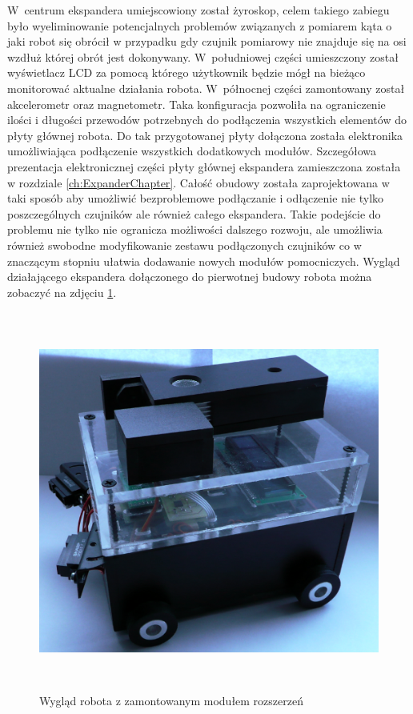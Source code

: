 W~centrum ekspandera umiejscowiony został żyroskop, celem takiego zabiegu było
wyeliminowanie potencjalnych problemów związanych z pomiarem kąta o jaki robot
się obrócił w przypadku gdy czujnik pomiarowy nie znajduje się na osi wzdłuż
której obrót jest dokonywany. W~południowej części umieszczony został
wyświetlacz LCD za pomocą którego użytkownik będzie mógł na bieżąco monitorować
aktualne działania robota. W~północnej części zamontowany został akcelerometr
oraz magnetometr. Taka konfiguracja pozwoliła na ograniczenie ilości i długości
przewodów potrzebnych do podłączenia wszystkich elementów do płyty głównej
robota. Do tak przygotowanej płyty dołączona została elektronika umożliwiająca
podłączenie wszystkich dodatkowych modułów. Szczegółowa prezentacja
elektronicznej części płyty głównej ekspandera zamieszczona została w rozdziale
\ref{ch:ExpanderChapter}. Całość obudowy została zaprojektowana w taki sposób
aby umożliwić bezproblemowe podłączanie i odłączenie nie tylko poszczególnych
czujników ale również całego ekspandera. Takie podejście do problemu nie
tylko nie ogranicza możliwości dalszego rozwoju, ale umożliwia również swobodne
modyfikowanie zestawu podłączonych czujników co w znaczącym stopniu
ułatwia dodawanie nowych modułów pomocniczych. Wygląd działającego ekspandera
dołączonego do pierwotnej budowy robota można zobaczyć na zdjęciu \ref{fig:DE2SideVIew}. 

\begin{figure}[h!]
 \centering
 \includegraphics[height=125mm]{../images/ch04/de2_side_view.png}
 \caption{Wygląd robota z zamontowanym modułem rozszerzeń}
 \label{fig:DE2SideVIew}
\end{figure}